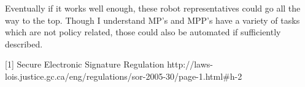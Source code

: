 \documentclass{report}
\begin{document}
Eventually if it works well enough, these robot representatives could go all the way to the top.  Though I understand MP's and MPP's have a variety of tasks which are not policy related, those could also be automated if sufficiently described.

[1] Secure Electronic Signature Regulation http://laws-lois.justice.gc.ca/eng/regulations/sor-2005-30/page-1.html#h-2
\end{document}

